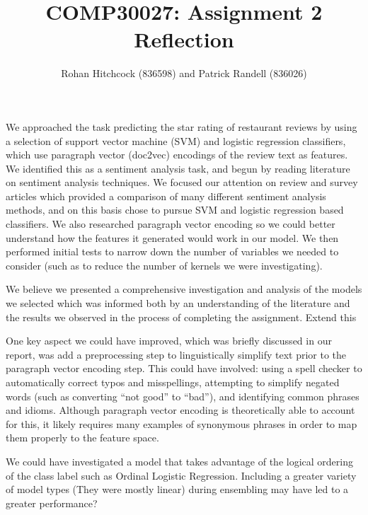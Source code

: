 \documentclass[11pt]{article}
\newcommand{\drafting}[1]{\textcolor{OliveGreen}{#1}}
\begin{document}
\title{\textbf{COMP30027: Assignment 2 Reflection}}
\author{Rohan Hitchcock (836598) and Patrick Randell (836026)}
\date{}
\maketitle

We approached the task predicting the star rating of restaurant reviews by using a selection of support vector machine (SVM) and logistic regression classifiers, which use paragraph vector (doc2vec) encodings of the review text as features. We identified this as a sentiment analysis task, and begun by reading literature on sentiment analysis techniques. We focused our attention on review and survey articles which provided a comparison of many different sentiment analysis methods, and on this basis chose to pursue SVM and logistic regression based classifiers. We also researched paragraph vector encoding so we could better understand how the features it generated would work in our model. We then performed initial tests to narrow down the number of variables we needed to consider (such as to reduce the number of kernels we were investigating).

We believe we presented a comprehensive investigation and analysis of the models we selected which was informed both by an understanding of the literature and the results we observed in the process of completing the assignment. \drafting{Extend this}

One key aspect we could have improved, which was briefly discussed in our report, was add a preprocessing step to linguistically simplify text prior to the paragraph vector encoding step. This could have involved: using a spell checker to automatically correct typos and misspellings, attempting to simplify negated words (such as converting ``not good'' to ``bad''), and identifying common phrases and idioms. Although paragraph vector encoding is theoretically able to account for this, it likely requires many examples of synonymous phrases in order to map them properly to the feature space.

\drafting{We could have investigated a model that takes advantage of the logical ordering of the class label such as Ordinal Logistic Regression. Including a greater variety of model types (They were mostly linear) during ensembling may have led to a greater performance?}
\end{document}
